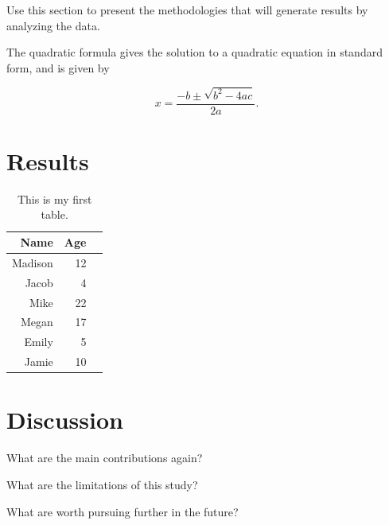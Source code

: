 \documentclass[12pt]{article}
\begin{document}
 Use this section to present the methodologies that will generate results by analyzing the data.

 The quadratic formula gives the solution to a quadratic equation in standard form, and is given by 

 \begin{equation}
    \label{eq:quadratic}
   x=\frac{-b\pm\sqrt{b^2-4ac}}{2a}.
   \end{equation}

 \section{Results}
 \label{sec:results}

 \begin{table}[h]
    \caption{This is my first table.}
    \label{tab:rv}
  \centering
  \begin{tabular}{rrr}
    \hline
  Name & Age \\ 
    \hline
    Madison & 12 \\ 
    Jacob & 4 \\ 
    Mike & 22 \\ 
    Megan & 17 \\ 
    Emily & 5 \\ 
    Jamie & 10 \\ 
     \hline
  \end{tabular}
  \end{table}

 \section{Discussion}
 \label{sec:disc}

 What are the main contributions again?

 What are the limitations of this study?

 What are worth pursuing further in the future?




 
\end{document}
